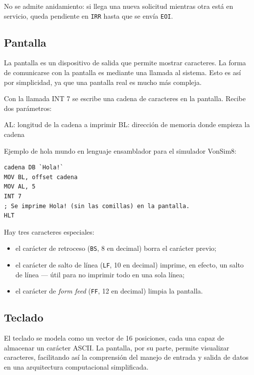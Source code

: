 \documentclass[12pt,oneside]{templates/unerthesis}
\providecommand{\tightlist}{%
  \setlength{\itemsep}{0pt}\setlength{\parskip}{0pt}}
\begin{document}
No se admite anidamiento: si llega una nueva solicitud mientras otra está en servicio, queda pendiente en \texttt{IRR} hasta que se envía \texttt{EOI}.

\hypertarget{pantalla}{%
\subsection{Pantalla}\label{pantalla}}

La pantalla es un dispositivo de salida que permite mostrar caracteres. La forma de comunicarse con la pantalla es mediante una llamada al sistema. Esto es así por simplicidad, ya que una pantalla real es mucho más compleja.

Con la llamada INT 7 se escribe una cadena de caracteres en la pantalla. Recibe dos parámetros:

AL: longitud de la cadena a imprimir
BL: dirección de memoria donde empieza la cadena

Ejemplo de hola mundo en lenguaje ensamblador para el simulador VonSim8:

\begin{lstlisting}
cadena DB `Hola!`
MOV BL, offset cadena
MOV AL, 5
INT 7
; Se imprime Hola! (sin las comillas) en la pantalla.
HLT\end{lstlisting}

Hay tres caracteres especiales:

\begin{itemize}
\tightlist
\item
  el carácter de retroceso (\texttt{BS}, 8 en decimal) borra el carácter previo;
\item
  el carácter de salto de línea (\texttt{LF}, 10 en decimal) imprime, en efecto, un salto de línea --- útil para no imprimir todo en una sola línea;
\item
  el carácter de \emph{form feed} (\texttt{FF}, 12 en decimal) limpia la pantalla.
\end{itemize}

\hypertarget{teclado}{%
\subsection{Teclado}\label{teclado}}

El teclado se modela como un vector de 16 posiciones, cada una capaz de almacenar un carácter ASCII. La pantalla, por su parte, permite visualizar caracteres, facilitando así la comprensión del manejo de entrada y salida de datos en una arquitectura computacional simplificada.
\end{document}
